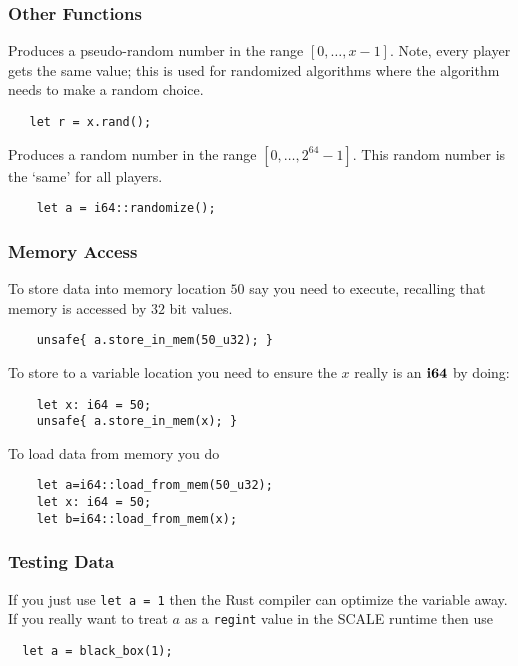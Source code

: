 \subsubsection{Other Functions}

Produces a pseudo-random number in the range $[0,\ldots,x-1]$.
Note, every player gets the same value; this is used for randomized
algorithms where the algorithm needs to make a random choice.
\begin{lstlisting}
   let r = x.rand();
\end{lstlisting}

Produces a random number in the range $[0,\ldots,2^{64}-1]$.
This random number is the `same' for all players.
\begin{lstlisting}
    let a = i64::randomize();
\end{lstlisting}

\subsubsection{Memory Access}
To store data into memory location $50$ say you need to execute,
recalling that memory is accessed by $32$ bit values.
\begin{lstlisting}
    unsafe{ a.store_in_mem(50_u32); }
\end{lstlisting}
To store to a variable location you need to ensure the $x$ really
is an $\mathbf{i64}$ by doing:
\begin{lstlisting}
    let x: i64 = 50;
    unsafe{ a.store_in_mem(x); }
\end{lstlisting}

To load data from memory you do
\begin{lstlisting}
    let a=i64::load_from_mem(50_u32);
    let x: i64 = 50;
    let b=i64::load_from_mem(x);
\end{lstlisting}


\subsubsection{Testing Data}

If you just use \verb|let a = 1| then the Rust compiler can optimize
the variable away. If you really want to treat $a$ as a \verb|regint|
value in the SCALE runtime then use
\begin{lstlisting}
  let a = black_box(1);
\end{lstlisting}


